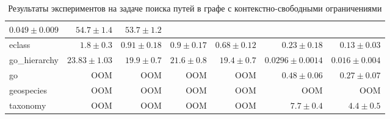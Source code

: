 \begin{landscape}
\begin{table}[]
{\begin{tabular}{|l|rrrrrr|}
  \multicolumn{1}{r|}{$0.049 \pm 0.009$} &
  \multicolumn{1}{r|}{$54.7 \pm 1.4$} &
  $53.7 \pm 1.2$ \\ \hline
eclass &
  \multicolumn{1}{r|}{$1.8 \pm 0.3$} &
  \multicolumn{1}{r|}{$0.91 \pm 0.18$} &
  \multicolumn{1}{r|}{$0.9 \pm 0.17$} &
  \multicolumn{1}{r|}{$0.68 \pm 0.12$} &
  \multicolumn{1}{r|}{$0.23 \pm 0.18$} &
  $0.13 \pm 0.03$ \\ \hline
go\_hierarchy &
  \multicolumn{1}{r|}{$23.83 \pm 1.03$} &
  \multicolumn{1}{r|}{$19.9 \pm 0.7$} &
  \multicolumn{1}{r|}{$21.6 \pm 0.8$} &
  \multicolumn{1}{r|}{$19.4 \pm 0.7$} &
  \multicolumn{1}{r|}{$0.0296 \pm 0.0014$} &
  $0.016 \pm 0.004$ \\ \hline
go &
  \multicolumn{1}{r|}{OOM} &
  \multicolumn{1}{r|}{OOM} &
  \multicolumn{1}{r|}{OOM} &
  \multicolumn{1}{r|}{OOM} &
  \multicolumn{1}{r|}{$0.48 \pm 0.06$} &
  $0.27 \pm 0.07$ \\ \hline
geospecies &
  \multicolumn{1}{r|}{OOM} &
  \multicolumn{1}{r|}{OOM} &
  \multicolumn{1}{r|}{OOM} &
  \multicolumn{1}{r|}{OOM} &
  \multicolumn{1}{r|}{OOM} &
  OOM \\ \hline
taxonomy &
  \multicolumn{1}{r|}{OOM} &
  \multicolumn{1}{r|}{OOM} &
  \multicolumn{1}{r|}{OOM} &
  \multicolumn{1}{r|}{OOM} &
  \multicolumn{1}{r|}{$7.7 \pm 0.4$} &
  $4.4 \pm 0.5$ \\ \hline
\end{tabular}%
}
\caption{Результаты экспериментов на задаче поиска путей в графе с контекстно-свободными ограничениями}
\label{tab:results_with_sppf}
\end{table}
\end{landscape}